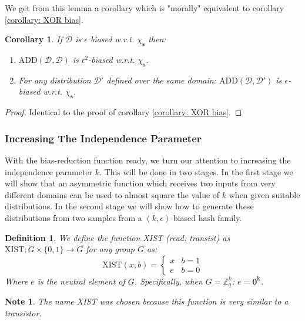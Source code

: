 \documentclass[12pt]{article}
\newtheorem{definition}{Definition}[section]
\newtheorem{corollary}{Corollary}[theorem]
\newtheorem{note}[theorem]{Note}
\newcommand{\dist}{\mathcal{D}}
\newcommand{\ADD}{\mathrm{ADD} }
\newcommand{\XIST}{\mathrm{XIST} }
\newcommand{\Z}{\mathbb{Z}}
\renewcommand{\vec}[1]{\bm{#1}}
\begin{document}
	We get from this lemma a corollary which is "morally" equivalent to corollary \ref{corollary: XOR bias}.
	\begin{corollary} \label{corollary: ADD bias}
		If $\dist$ is $\epsilon$ biased w.r.t. $\chi_{\vec{s}}$ then:
		\begin{enumerate}
			\item $\ADD(\dist, \dist)$ is $\epsilon^2$-biased w.r.t. $\chi_{\vec{s}}$.
			\item For any distribution $\dist'$ defined over the same domain: $\ADD(\dist, \dist')$ is $\epsilon$-biased w.r.t. $\chi_{\vec{s}}$.
		\end{enumerate}
	\end{corollary}
	
	\begin{proof}
		Identical to the proof of corollary \ref{corollary: XOR bias}.
	\end{proof}
	
	\subsubsection{Increasing The Independence Parameter}
	
	With the bias-reduction function ready, we turn our attention to increasing the independence parameter $k$.
	This will be done in two stages.
	In the first stage we will show that an asymmetric function which receives two inputs from very different domains can be used to almost square the value of $k$ when given suitable distributions.
	In the second stage we will show how to generate these distributions from two samples from a $(k,\epsilon)$-biased hash family.
	
	\begin{definition}
		We define the function XIST (read: transist) as $\XIST : G \times \{0,1\} \rightarrow G$ for any group $G$ as:
		\begin{equation*}
			\XIST(x,b) =
			\begin{cases}
				x & b = 1 \\
				e & b = 0
			\end{cases}
		\end{equation*}
		Where $e$ is the neutral element of $G$.
		Specifically, when $G = \Z_q^k$: $e = \vec{0^k}$.
	\end{definition}
	
	\begin{note}
		The name XIST was chosen because this function is very similar to a transistor.
	\end{note}
	
\end{document}
